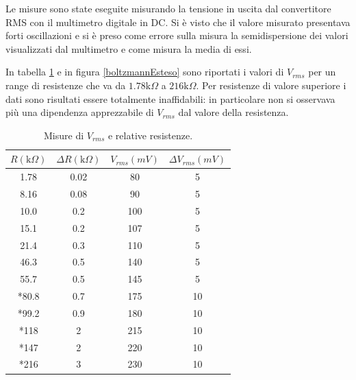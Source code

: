 \documentclass[10pt,a4paper]{article}
\begin{document}
Le misure sono state eseguite misurando la tensione in uscita dal convertitore RMS con il multimetro digitale in DC. Si è visto che il valore misurato presentava forti oscillazioni e si è preso come errore sulla misura la semidispersione dei valori visualizzati dal multimetro e come misura la media di essi.

In tabella \ref{bodeEstesi} e in figura \ref{boltzmannEsteso} sono riportati i valori di $V_{rms}$ per un range di resistenze che va da $1.78\mbox{k}\Omega$ a $216\mbox{k}\Omega$. Per resistenze di valore superiore i dati sono risultati essere totalmente inaffidabili: in particolare non si osservava più una dipendenza apprezzabile di $V_{rms}$ dal valore della resistenza.


\begin{table}[!htb]\centering
\begin{tabular}{|c|c|c|c|}
\hline
$R (\mbox{k}\Omega)$ & $\Delta R (\mbox{k}\Omega)$ & $V_{rms} (mV)$ & $\Delta V_{rms} (mV)$\\
\hline
1.78 & 0.02 & 80 & 5\\
8.16 & 0.08 & 90 & 5\\
10.0 & 0.2 & 100 & 5\\
15.1 & 0.2 & 107 & 5\\
21.4 & 0.3 & 110 & 5\\
46.3 & 0.5 & 140 & 5\\
55.7 & 0.5 & 145 & 5\\
*80.8 & 0.7 & 175 & 10\\
*99.2 & 0.9 & 180 & 10\\
*118 & 2 & 215 & 10\\
*147 & 2 & 220 & 10\\
*216 & 3 & 230 & 10\\
\hline
\end{tabular}
\caption{Misure di $V_{rms}$ e relative resistenze.}
\label{bodeEstesi}
\end{table}
\end{document}
